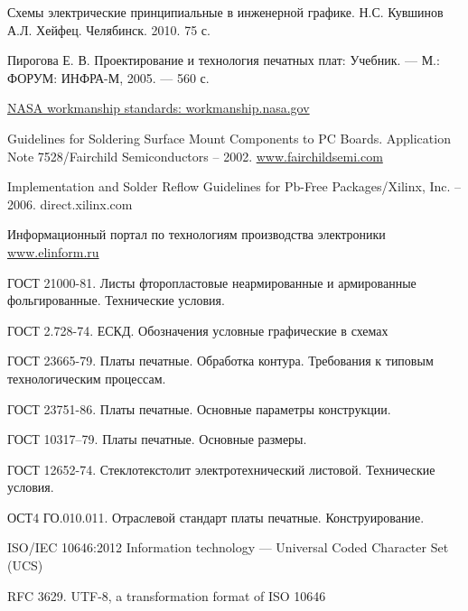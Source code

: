  Схемы электрические принципиальные в инженерной графике.
    Н.С. Кувшинов А.Л. Хейфец. Челябинск. 2010. 75 с.

 Пирогова Е. В. Проектирование и технология печатных плат:
    Учебник. — М.: ФОРУМ: ИНФРА-М, 2005. — 560 с.

    \href{http://workmanship.nasa.gov/insp.html}
         {NASA workmanship standards: workmanship.nasa.gov}

 Guidelines for Soldering Surface Mount
    Components to PC Boards.
    Application Note 7528/Fairchild Semiconductors – 2002.
    \href{http://www.fairchildsemi.com}{www.fairchildsemi.com}

 Implementation and Solder Reflow Guidelines
    for Pb-Free Packages/Xilinx, Inc. – 2006.  direct.xilinx.com

 Информационный портал по технологиям производства электроники
    \href{http://www.elinform.ru}{www.elinform.ru}

 ГОСТ 21000-81. Листы фторопластовые неармированные и
    армированные фольгированные. Технические условия.

 ГОСТ 2.728-74. ЕСКД. Обозначения условные графические в
    схемах

 ГОСТ 23665-79. Платы печатные. Обработка контура.
    Требования к типовым технологическим процессам.

 ГОСТ 23751-86. Платы печатные. Основные параметры
    конструкции.

 ГОСТ 10317–79. Платы печатные. Основные размеры.

 ГОСТ 12652-74. Стеклотекстолит электротехнический
    листовой. Технические условия.

 ОСТ4 ГО.010.011. Отраслевой стандарт платы печатные.
    Конструирование.

 ISO/IEC 10646:2012 Information technology ---
    Universal Coded Character Set (UCS)

 RFC 3629. UTF-8, a transformation format of ISO 10646
